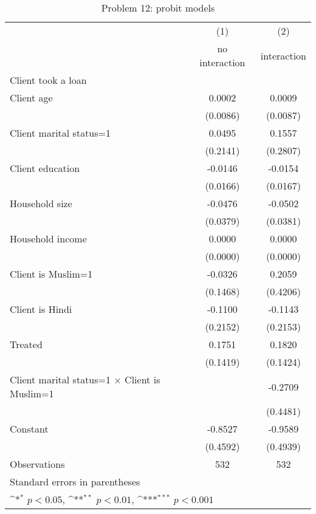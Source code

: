 \begin{table}[htbp]\centering
\def\sym#1{\ifmmode^{#1}\else\(^{#1}\)\fi}
\caption{Problem 12: probit models \label{q12}}
\begin{tabular}{l*{2}{c}}
\toprule
     &\multicolumn{1}{c}{(1)}&\multicolumn{1}{c}{(2)}\\
     &\multicolumn{1}{c}{no interaction}&\multicolumn{1}{c}{interaction}\\
\midrule
Client took a loan&                     &                     \\
Client age&      0.0002         &      0.0009         \\
     &    (0.0086)         &    (0.0087)         \\
\addlinespace
Client marital status=1&      0.0495         &      0.1557         \\
     &    (0.2141)         &    (0.2807)         \\
\addlinespace
Client education&     -0.0146         &     -0.0154         \\
     &    (0.0166)         &    (0.0167)         \\
\addlinespace
Household size&     -0.0476         &     -0.0502         \\
     &    (0.0379)         &    (0.0381)         \\
\addlinespace
Household income&      0.0000         &      0.0000         \\
     &    (0.0000)         &    (0.0000)         \\
\addlinespace
Client is Muslim=1&     -0.0326         &      0.2059         \\
     &    (0.1468)         &    (0.4206)         \\
\addlinespace
Client is Hindi&     -0.1100         &     -0.1143         \\
     &    (0.2152)         &    (0.2153)         \\
\addlinespace
Treated&      0.1751         &      0.1820         \\
     &    (0.1419)         &    (0.1424)         \\
\addlinespace
Client marital status=1 $\times$ Client is Muslim=1&                     &     -0.2709         \\
     &                     &    (0.4481)         \\
\addlinespace
Constant&     -0.8527         &     -0.9589         \\
     &    (0.4592)         &    (0.4939)         \\
\midrule
Observations&         532         &         532         \\
\bottomrule
\multicolumn{3}{l}{\footnotesize Standard errors in parentheses}\\
\multicolumn{3}{l}{\footnotesize \sym{*} \(p<0.05\), \sym{**} \(p<0.01\), \sym{***} \(p<0.001\)}\\
\end{tabular}
\end{table}
